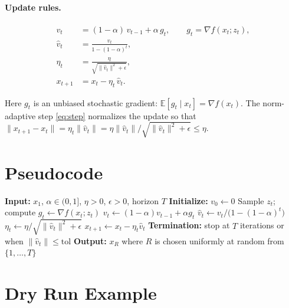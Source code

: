 \documentclass[11pt]{article}
\begin{document}
\paragraph{Update rules.}
\begin{align}
v_t        &= (1-\alpha)\, v_{t-1} + \alpha\, g_t,
   \qquad g_t = \nabla f(x_t;z_t), \label{eq:vt}\\
\hat v_t   &= \frac{v_t}{1-(1-\alpha)^t}, \label{eq:bias}\\
\eta_t     &= \frac{\eta}{\sqrt{\|\hat v_t\|^2 + \epsilon}}, \label{eq:step}\\
x_{t+1}    &= x_t - \eta_t\, \hat v_t. \label{eq:upd}
\end{align}

Here $g_t$ is an unbiased stochastic gradient: $\mathbb{E}[g_t \mid x_t] = \nabla f(x_t)$.
The norm-adaptive step \eqref{eq:step} normalizes the update so that
$\|x_{t+1}-x_t\| = \eta_t\|\hat v_t\| = \eta \|\hat v_t\|/\sqrt{\|\hat v_t\|^2+\epsilon} \le \eta$.

\section*{Pseudocode}

\begin{algorithm}[H]
\caption{RVE-NA: Recursive Variance Estimator with Norm-Adaptive Step}
\begin{algorithmic}[1]
\State \textbf{Input:} $x_1$, $\alpha\in(0,1]$, $\eta>0$, $\epsilon>0$, horizon $T$
\State \textbf{Initialize:} $v_0 \gets 0$
    \State Sample $z_t$; compute $g_t \gets \nabla f(x_t;z_t)$
    \State $v_t \gets (1-\alpha) v_{t-1} + \alpha g_t$ 
    \State $\hat v_t \gets v_t / \big(1-(1-\alpha)^t\big)$ 
    \State $\eta_t \gets \eta / \sqrt{\|\hat v_t\|^2 + \epsilon}$ 
    \State $x_{t+1} \gets x_t - \eta_t \hat v_t$
\EndFor
\State \textbf{Termination:} stop at $T$ iterations or when $\|\hat v_t\| \le \mathrm{tol}$
\State \textbf{Output:} $x_R$ where $R$ is chosen uniformly at random from $\{1,\dots,T\}$
\end{algorithmic}
\end{algorithm}

\section*{Dry Run Example}
\end{document}
